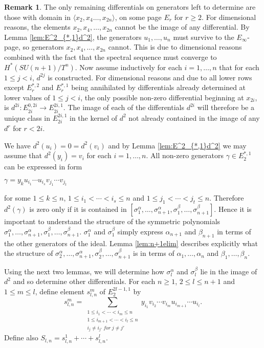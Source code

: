 \documentclass{article}
\theoremstyle{plain}
\theoremstyle{definition}
\newtheorem{rmk}[thm]{Remark}
\numberwithin{thm}{section}
\begin{document}
				\begin{rmk}\label{rmk:unique}
				The only remaining differentials on generators left to determine are those with domain in
				$\langle x_2,x_4\dots,x_{2n} \rangle$, on some page $E_r$ for $r \geq 2$.
				For dimensional reasons, the elements $x_2,x_4,\dots,x_{2n}$ cannot be the image of any differential.
				By Lemma \ref{lem:E^2_{*,1}d^2}, the generators $u_1,\dots,u_n$ must survive to the $E_{\infty}$-page,
				so generators $x_2,x_4,\dots,x_{2n}$ cannot.	
				This is due to dimensional reasons combined with the fact that the spectral sequence must converge to $H^*(SU(n+1)/T^n)$.
				Now assume inductively for each $i=1,\dots,n$ that for each $1\leq j<i$, $d^{2j}$ is constructed.
				For dimensional reasons and due to all lower rows except $E_r^{*,2}$ and $E_r^{*,1}$ being annihilated by differentials already determined at lower values of
				$1\leq j<i$, the only possible non-zero differential beginning at $x_{2i}$,
				is $d^{2i}:E_{2i}^{0,2i}\to E_{2i}^{2i,1}$.
				The image of each of the differentials $d^{2i}$ will therefore be a unique class in $E_{2i}^{2i,1}$
				in the kernel of $d^2$ not already contained in the image of any $d^r$ for $r<2i$.
				\end{rmk}
					
				We have $d^2(u_i)=0=d^2(v_i)$ and by Lemma \ref{lem:E^2_{*,1}d^2} we may assume that $d^2(y_i)=v_i$ for each $i=1,\dots,n$.
				All non-zero generators $\gamma \in E_2^{*,1}$ can be expressed in form
				\begin{center}
					$\gamma = y_k u_{i_1} \cdots u_{i_s} v_{j_1} \cdots v_{j_t}$
				\end{center}
				for some $1\leq k \leq n$, $1\leq i_1<\cdots<i_s\leq n$ and $1\leq j_1<\cdots<j_t\leq n$.
				Therefore $d^2(\gamma)$ is zero only if it is contained in
				$[\sigma^{\alpha}_1,\dots,\sigma^{\alpha}_{n+1}, \sigma^{\beta}_1,\dots,\sigma^{\beta}_{n+1}]$.
				Hence it is important to understand the structure of the symmetric polynomials
				$\sigma^{\alpha}_1,\dots,\sigma^{\alpha}_{n+1}, \sigma^{\beta}_1,\dots,\sigma^{\beta}_{n+1}$.
				$\sigma^{\alpha}_1$ and $\sigma^{\beta}_1$ simply express $\alpha_{n+1}$ and $\beta_{n+1}$ in terms of the other generators of the ideal.
				Lemma \ref{lem:n+1elim} describes explicitly what the structure of 
				$\sigma^{\alpha}_2,\dots,\sigma^{\alpha}_{n+1}, \sigma^{\beta}_2,\dots,\sigma^{\beta}_{n+1}$
				is in terms of $\alpha_1,\dots,\alpha_{n}$
				and $\beta_1,\dots,\beta_{n}$.
				
				Using the next two lemmas, we will determine how $\sigma_l^\alpha$ and $\sigma_l^\beta$ lie in the image of $d^2$ and so determine other differentials.
				For each $n \geq 1$, $2 \leq l \leq n+1$ and $1\leq m\leq l$, define element $s_{l,n}^m$ of $E_2^{2l-1,1}$ by
				\begin{equation*}
					s_{l,n}^m=\sum_{\substack{1\leq i_1<\cdots<i_m\leq n\\ 1\leq i_{m+1}<\cdots<i_l\leq n\\ i_j \neq i_{j'} \; for \; j \neq j'}}
					{y_{i_1}v_{i_2}\cdots v_{i_m} u_{i_{m+1}}\cdots u_{i_l}}.
				\end{equation*}
				Define also $S_{l,n}=s_{l,n}^1+\cdots+s_{l,n}^l$.
			
\end{document}
